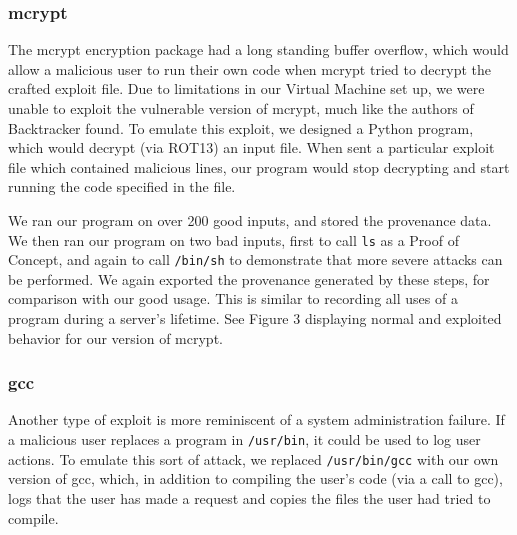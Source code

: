 \documentclass[10pt,twocolumn]{article}
\begin{document}
\subsubsection{mcrypt}
The mcrypt encryption package had a long standing buffer overflow, which would allow a malicious user to run their own code when mcrypt tried to decrypt the crafted exploit file. Due to limitations in our Virtual Machine set up, we were unable to exploit the vulnerable version of mcrypt, much like the authors of Backtracker \cite{backtracker} found. To emulate this exploit, we designed a Python program, which would decrypt (via ROT13) an input file. When sent a particular exploit file which contained malicious lines, our program would stop decrypting and start running the code specified in the file.

We ran our program on over 200 good inputs, and stored the provenance data. We then ran our program on two bad inputs, first to call \texttt{ls} as a Proof of Concept, and again to call \texttt{/bin/sh} to demonstrate that more severe attacks can be performed. We again exported the provenance generated by these steps, for comparison with our good usage. This is similar to recording all uses of a program during a server's lifetime. See Figure 3 displaying normal and exploited behavior for our version of mcrypt.

\subsubsection{gcc}
Another type of exploit is more reminiscent of a system administration failure. If a malicious user replaces a program in \texttt{/usr/bin}, it could be used to log user actions. To emulate this sort of attack, we replaced \texttt{/usr/bin/gcc} with our own version of gcc, which, in addition to compiling the user's code (via a call to gcc), logs that the user has made a request and copies the files the user had tried to compile. 
\end{document}
